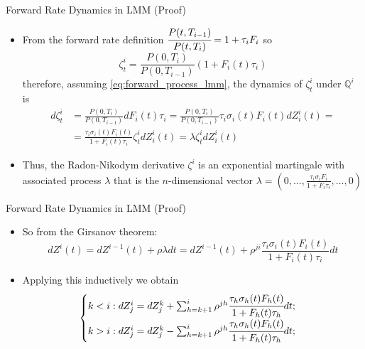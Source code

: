 \documentclass{beamer}
\begin{document}
\begin{frame}{Forward Rate Dynamics in LMM (Proof)}
  \begin{itemize}
  \item<1-> From the forward rate definition $\cfrac{P(t,T_{i-1})}{P(t,T_i)} = 1 + \tau_i F_i$ so
    \begin{equation*}
      \zeta^i_t = \frac{P(0, T_i)}{P(0, T_{i-1})}(1+F_i(t)\tau_i)
    \end{equation*}
    therefore, assuming \cref{eq:forward_process_lmm}, the dynamics of $\zeta^i_t$ under $\mathbb{Q}^i$ is
    \begin{equation*}
      \begin{aligned}
	d\zeta^i_t &= \frac{P(0, T_i)}{P(0, T_{i-1})}dF_i(t)\tau_i = \frac{P(0, T_i)}{P(0, T_{i-1})}\tau_i\sigma_i(t)F_i(t)dZ^i_i(t) = \\ &= \frac{\tau_i\sigma_i(t)F_i(t)}{1+F_i(t)\tau_i}\zeta_t^idZ^i_i(t)=\lambda \zeta_t^idZ^i_i(t)
      \end{aligned}
    \end{equation*}
  \item<2-> Thus, the Radon-Nikodym derivative $\zeta^i$ is an exponential martingale with associated process $\lambda$ that is the $n$-dimensional vector $\lambda = \left(0,\ldots,\frac{\tau_i\sigma_iF_i}{1+F_i\tau_i},\ldots, 0\right)$
  \end{itemize}
\end{frame}

\begin{frame}{Forward Rate Dynamics in LMM (Proof)}
  \begin{itemize}
  \item<1-> So from the Girsanov theorem:
    \begin{equation*}
      dZ^i(t) = dZ^{i-1}(t)+\rho\lambda dt = dZ^{i-1}(t)+\rho^{ji}\frac{\tau_i\sigma_i(t)F_i(t)}{1+F_i(t)\tau_i} dt
    \end{equation*}
  \item<2-> Applying this inductively we obtain
    \begin{equation*}
  	\begin{cases}
	k < i : dZ^i_j = dZ^k_j + \sum_{h=k+1}^i \rho^{jh}\cfrac{\tau_h\sigma_h(t)F_h(t)}{1+F_h(t)\tau_h} dt;\\
	k > i : dZ^i_j = dZ^k_j - \sum_{h=k+1}^i \rho^{jh}\cfrac{\tau_h\sigma_h(t)F_h(t)}{1+F_h(t)\tau_h} dt;\\
  	\end{cases}
    \end{equation*}
  \end{itemize}
\end{frame}
\end{document}
